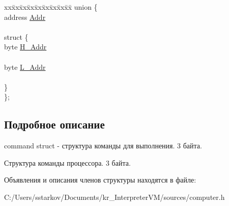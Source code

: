 \begin{DoxyCompactItemize}
\begin{tabbing}
\end{tabbing}\item 
\hypertarget{struct_computer_1_1command_aea8343f26b8cf44fe3f684579bca1a12}{}\label{struct_computer_1_1command_aea8343f26b8cf44fe3f684579bca1a12} 
\begin{tabbing}
xx\=xx\=xx\=xx\=xx\=xx\=xx\=xx\=xx\=\kill
union \{\\
\>address \hyperlink{struct_computer_1_1command_a0e07591012953413797506f7bc3cb1a7}{Addr}\\
\>\\
\hypertarget{union_computer_1_1command_1_1_0D2_adb09ec420e7388614fefa31fb49e6320}{}\label{union_computer_1_1command_1_1_0D2_adb09ec420e7388614fefa31fb49e6320} 
\>struct \{\\
\>\>byte \hyperlink{struct_computer_1_1command_a840bf646fc591a80cd94f253bb8cae02}{H\_Addr}\\
\>\>\\
\>\>byte \hyperlink{struct_computer_1_1command_afe8e3496cc61746a889f53f91ed66d45}{L\_Addr}\\
\>\>\\
\>\} \\
\}; \\

\end{tabbing}\end{DoxyCompactItemize}


\subsection{Подробное описание}
command struct -\/ структура команды для выполнения. 3 байта. 

Структура команды процессора. 3 байта. 

Объявления и описания членов структуры находятся в файле\+:\begin{DoxyCompactItemize}
\item 
C\+:/\+Users/sstarkov/\+Documents/kr\+\_\+\+Interpreter\+V\+M/sources/computer.\+h\end{DoxyCompactItemize}
